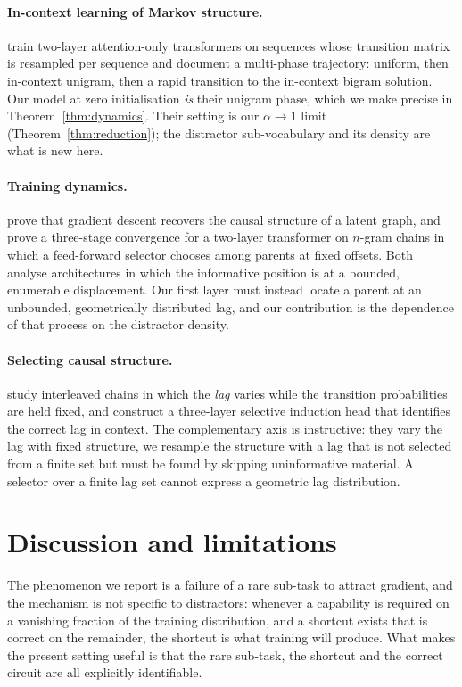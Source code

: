 \paragraph{In-context learning of Markov structure.}
\citet{edelman2024} train two-layer attention-only transformers on sequences whose transition
matrix is resampled per sequence and document a multi-phase trajectory: uniform, then in-context
unigram, then a rapid transition to the in-context bigram solution. Our model at zero
initialisation \emph{is} their unigram phase, which we make precise in
Theorem~\ref{thm:dynamics}. Their setting is our $\alpha\to1$ limit
(Theorem~\ref{thm:reduction}); the distractor sub-vocabulary and its density are what is new here.

\paragraph{Training dynamics.}
\citet{nichani2024} prove that gradient descent recovers the causal structure of a latent graph,
and \citet{unveiling2024} prove a three-stage convergence for a two-layer transformer on $n$-gram
chains in which a feed-forward selector chooses among parents at fixed offsets. Both analyse
architectures in which the informative position is at a bounded, enumerable displacement. Our
first layer must instead locate a parent at an unbounded, geometrically distributed lag, and our
contribution is the dependence of that process on the distractor density.

\paragraph{Selecting causal structure.}
\citet{selective2025} study interleaved chains in which the \emph{lag} varies while the
transition probabilities are held fixed, and construct a three-layer selective induction head that
identifies the correct lag in context. The complementary axis is instructive: they vary the lag
with fixed structure, we resample the structure with a lag that is not selected from a finite set
but must be found by skipping uninformative material. A selector over a finite lag set cannot
express a geometric lag distribution.

\section{Discussion and limitations}
\label{sec:limitations}

The phenomenon we report is a failure of a rare sub-task to attract gradient, and the mechanism is
not specific to distractors: whenever a capability is required on a vanishing fraction of the
training distribution, and a shortcut exists that is correct on the remainder, the shortcut is
what training will produce. What makes the present setting useful is that the rare sub-task, the
shortcut and the correct circuit are all explicitly identifiable.


